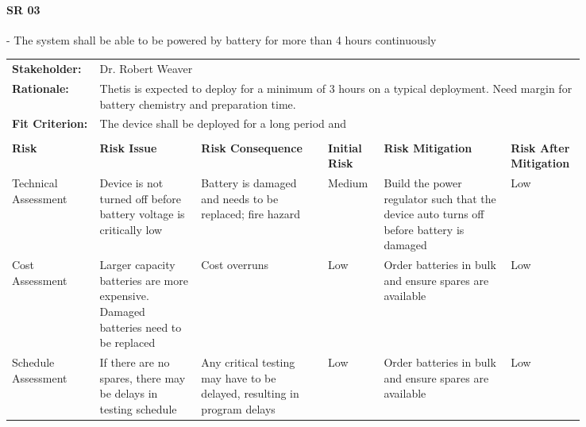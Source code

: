 \begin{landscape}


\paragraph*{SR 03} - The system shall be able to be powered by battery for more than 4 hours continuously

{\fontsize{8pt}{8pt}\selectfont
\begin{longtable}{| p{0.12\linewidth} | p{0.16\linewidth} |  p{0.20\linewidth} | p{0.08\linewidth} | p{0.20\linewidth} | p{0.08\linewidth} |}
	\hline \endlastfoot
	
	\hline
	\rowcolor[gray]{0.8}
	\multicolumn{6}{|c|}{ } \\
	\hline
	\textbf{Stakeholder:} & \multicolumn{5}{|l|}{Dr. Robert Weaver} \\
	\hline
	\textbf{Rationale:} & \multicolumn{5}{|p{0.8\linewidth}|}{Thetis is expected to deploy for a minimum of 3 hours on a typical deployment. Need margin for battery chemistry and preparation time.} \\
	\hline
	\textbf{Fit Criterion:} & \multicolumn{5}{|p{0.8\linewidth}|}{The device shall be deployed for a long period and } \\
	\hline
	\rowcolor[gray]{0.8}
	\multicolumn{6}{|c|}{ } \\
	\hline
	\textbf{Risk} & \textbf{Risk Issue} & \textbf{Risk Consequence} & \textbf{Initial Risk} & \textbf{Risk Mitigation} & \textbf{Risk \newline After \newline Mitigation} \\
	\hline
	Technical \newline Assessment & Device is not turned off before battery voltage is critically low & Battery is damaged and needs to be replaced; fire hazard & \cellcolor{yellow} Medium & Build the power regulator such that the device auto turns off before battery is damaged & \cellcolor{green} Low \\
	\hline
	Cost \newline Assessment & Larger capacity batteries are more expensive. \newline Damaged batteries need to be replaced & Cost overruns & \cellcolor{green} Low & Order batteries in bulk and ensure spares are available & \cellcolor{green} Low \\
	\hline
	Schedule \newline Assessment & If there are no spares, there may be delays in testing schedule & Any critical testing may have to be delayed, resulting in program delays & \cellcolor{green} Low & Order batteries in bulk and ensure spares are available & \cellcolor{green} Low \\

\end{longtable}}
\end{landscape}
